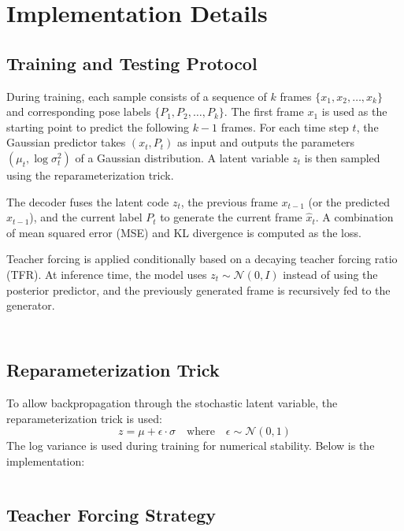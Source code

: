 \section{Implementation Details}
\label{sec:implementation}

\subsection{Training and Testing Protocol}

During training, each sample consists of a sequence of $k$ frames $\{x_1, x_2, \ldots, x_k\}$ and corresponding pose labels $\{P_1, P_2, \ldots, P_k\}$. The first frame $x_1$ is used as the starting point to predict the following $k-1$ frames. For each time step $t$, the Gaussian predictor takes $(x_t, P_t)$ as input and outputs the parameters $(\mu_t, \log \sigma^2_t)$ of a Gaussian distribution. A latent variable $z_t$ is then sampled using the reparameterization trick.

The decoder fuses the latent code $z_t$, the previous frame $x_{t-1}$ (or the predicted $\hat{x}_{t-1}$), and the current label $P_t$ to generate the current frame $\hat{x}_t$. A combination of mean squared error (MSE) and KL divergence is computed as the loss.

Teacher forcing is applied conditionally based on a decaying teacher forcing ratio (TFR). At inference time, the model uses $z_t \sim \mathcal{N}(0, I)$ instead of using the posterior predictor, and the previously generated frame is recursively fed to the generator.

\inputminted[firstline=230, lastline=264, highlightlines={127}]{python}{../Trainer.py}
\inputminted[firstline=141, lastline=159, highlightlines={152-154,157-159}]{python}{../Trainer.py}

\subsection{Reparameterization Trick}

To allow backpropagation through the stochastic latent variable, the reparameterization trick is used:
\[
    z = \mu + \epsilon \cdot \sigma \quad \text{where} \quad \epsilon \sim \mathcal{N}(0, 1)
\]
The log variance is used during training for numerical stability. Below is the implementation:

\inputminted[firstline=64, lastline=88, highlightlines={76-80}]{python}{../modules/modules.py}

\subsection{Teacher Forcing Strategy}

